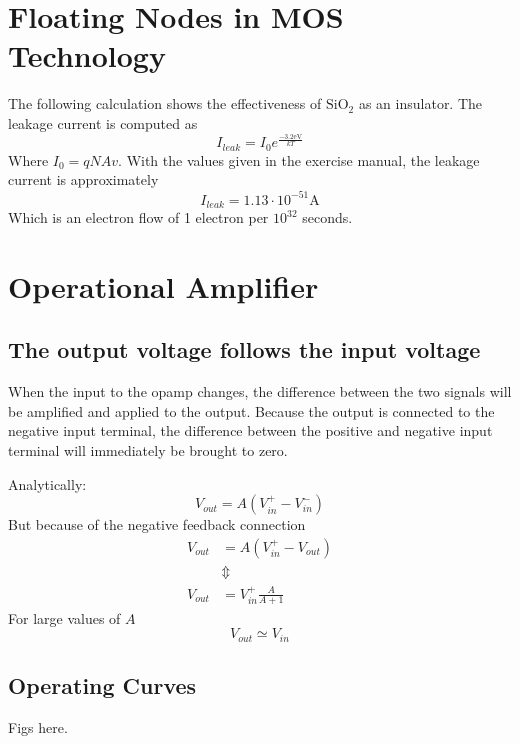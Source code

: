 


\newpage
\section{Floating Nodes in MOS Technology}
The following calculation shows the effectiveness of \(\mathrm{SiO}_2\) as an insulator. The leakage current is computed as
\begin{equation*}
    I_{leak} = I_0e^{\frac{-3.2 \mathrm{eV}}{kT}}
\end{equation*}
Where \(I_0 = qNAv\). With the values given in the exercise manual, the leakage current is approximately
\begin{equation*}
    I_{leak} = 1.13 \cdot 10^{-51} \mathrm{A}
\end{equation*}
Which is an electron flow of 1 electron per \(10^{32}\) seconds.

\section{Operational Amplifier}
\subsection{The output voltage follows the input voltage}
When the input to the opamp changes, the difference between the two signals will be amplified and applied to the output.
Because the output is connected to the negative input terminal, the difference between the positive and negative input terminal
will immediately be brought to zero.

Analytically:
\begin{equation*}
    V_{out} = A(V_{in}^+ - V_{in}^-)
\end{equation*}
But because of the negative feedback connection
\begin{align*}
    V_{out} &= A(V_{in}^+ - V_{out}) \\
            &\Updownarrow \\
    V_{out} &= V_{in}^+ \frac{A}{A+1}
\end{align*}
For large values of \(A\)
\begin{equation*}
    V_{out} \simeq V_{in}
\end{equation*}

\subsection{Operating Curves}
Figs here.

